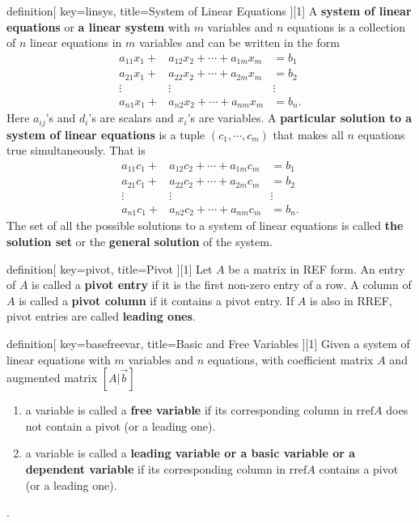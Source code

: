 \begin{SaveConcept}{definition}[
		key=linsys,
		title={System of Linear Equations}
	][1]
        A \textbf{system of linear equations} or \textbf{a linear system} with $m$ variables and $n$ equations is a collection of $n$ linear equations in $m$ variables and can be written in the form 
	\begin{eqnarray*}\label{system}
		a_{11}x_{1}+&a_{12}x_{2}+\cdots+ a_{1m}x_{m}&=b_1\\\nonumber
		a_{21}x_{1}+&a_{22}x_{2}+\cdots +a_{2m}x_{m}&=b_2\\\nonumber
		\vdots&\vdots&\vdots\\\nonumber
		a_{n1}x_{1}+&a_{n2}x_{2}+\cdots +a_{nm}x_{m}&=b_n.
	\end{eqnarray*}
	Here $a_{ij}$'s and $d_i$'s are scalars and $x_i$'s are variables. 
	A \textbf{ particular solution to a  system of linear equations} is a tuple $(c_1,\cdots,c_m)$ that makes all $n$ equations true simultaneously. That is 
	\begin{eqnarray*}
		a_{11}c_{1}+&a_{12}c_{2}+\cdots+ a_{1m}c_{m}&=b_1\\\nonumber
		a_{21}c_{1}+&a_{22}c_{2}+\cdots +a_{2m}c_{m}&=b_2\\\nonumber
		\vdots&\vdots&\vdots\\\nonumber
		a_{n1}c_{1}+&a_{n2}c_{2}+\cdots +a_{nm}c_{m}&=b_n.\nonumber
	\end{eqnarray*}
	The set of all the possible solutions to a system of linear equations is called \textbf{the solution set} or the \textbf{general solution} of the system.
\end{SaveConcept}


\begin{SaveConcept}{definition}[
		key=pivot,
		title={Pivot}
	][1]
        Let $A$  be a matrix in REF form. An entry of $A$ is called a \textbf{pivot entry} if it is the first non-zero entry of a row. A column of $A$ is called a \textbf{pivot column} if it contains a pivot entry.  If $A$ is also in RREF, pivot entries are called \textbf{leading ones}.
\end{SaveConcept}

\begin{SaveConcept}{definition}[
		key=basefreevar,
		title={Basic and Free Variables}
	][1]
	Given a system of linear equations with $m$ variables and $n$ equations, with coefficient matrix $A$ and augmented matrix $[A|\vec b]$
	\begin{enumerate}
		\item a variable is called a \textbf{free variable} if its corresponding column in $\mathrm{rref} A$ does not contain a pivot (or a leading one).
		\item a variable is called a \textbf{leading variable or a basic variable or a dependent variable} if its corresponding column in $\mathrm{rref} A$ contains a pivot (or a leading one).
	\end{enumerate}.
\end{SaveConcept}


